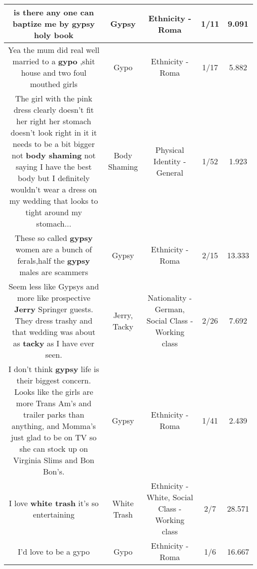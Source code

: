 \documentclass[11pt]{article}
\newlength\mylength
\begin{document}
\begin{center}
\begin{longtable}{|C{.65\mylength}|C{.30\mylength}|C{.12\mylength}|C{.12\mylength}|C{.12\mylength}|}
  \small is there any one can baptize me by \textbf{gypsy} holy book\normalsize   & Gypsy & Ethnicity - Roma & 1/11 & 9.091 \\  \hline
  \small Yea the mum did real well married to a \textbf{gypo} ,shit house and two foul mouthed girls\normalsize   & Gypo & Ethnicity - Roma & 1/17 & 5.882 \\  \hline
  \small The girl with the pink dress clearly doesn't fit her right her stomach doesn't look right in it it needs to be a bit bigger not \textbf{body shaming} not saying I have the best body but I definitely wouldn't wear a dress on my wedding that looks to tight around my stomach...\normalsize   & Body Shaming & Physical Identity - General & 1/52 & 1.923 \\  \hline
  \small These so called \textbf{gypsy} women are a bunch of ferals,half the \textbf{gypsy} males are scammers\normalsize   & Gypsy & Ethnicity - Roma & 2/15 & 13.333 \\  \hline
  \small Seem less like Gypsys and more like prospective \textbf{Jerry} Springer guests. They dress trashy and that wedding was about as \textbf{tacky} as I have ever seen.\normalsize   & Jerry, Tacky & Nationality - German, Social Class - Working class & 2/26 & 7.692 \\  \hline
  \small I don't think \textbf{gypsy} life is their biggest concern. Looks like the girls are more Trans Am's and trailer parks than anything, and Momma's just glad to be on TV so she can stock up on Virginia Slims and Bon Bon's.\normalsize   & Gypsy & Ethnicity - Roma & 1/41 & 2.439 \\  \hline
  \small I love \textbf{w\textbf{hite trash}} it's so entertaining\normalsize   & White Trash & Ethnicity - White, Social Class - Working class & 2/7 & 28.571 \\  \hline
  \small I'd love to be a gypo\normalsize   & Gypo & Ethnicity - Roma & 1/6 & 16.667 \\  \hline

\end{longtable}
\end{center}
\end{document}
